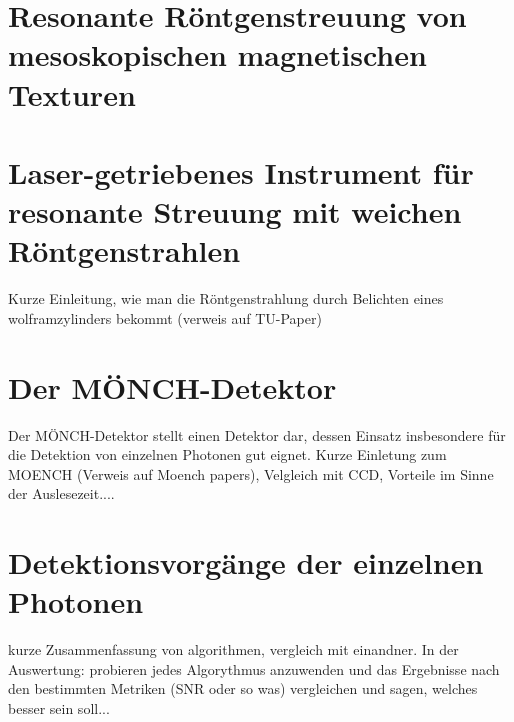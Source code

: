 \section{Resonante Röntgenstreuung von mesoskopischen magnetischen Texturen}
\section{Laser-getriebenes Instrument für resonante Streuung mit weichen Röntgenstrahlen}
\cite{schick_laser-driven_2021}
Kurze Einleitung, wie man die Röntgenstrahlung durch Belichten eines wolframzylinders bekommt (verweis auf TU-Paper)
\section{Der MÖNCH-Detektor}
Der MÖNCH-Detektor stellt einen Detektor dar, dessen Einsatz insbesondere für die Detektion von einzelnen Photonen gut eignet. \cite{bergamaschi_monch_2018}
Kurze Einletung zum MOENCH (Verweis auf Moench papers), Velgleich mit CCD, Vorteile im Sinne der Auslesezeit....
\section{Detektionsvorgänge der einzelnen Photonen}
kurze Zusammenfassung von algorithmen, vergleich mit einandner. In der Auswertung: probieren jedes Algorythmus anzuwenden und das Ergebnisse nach den bestimmten Metriken (SNR oder so was) vergleichen und sagen, welches besser sein soll...
\newpage